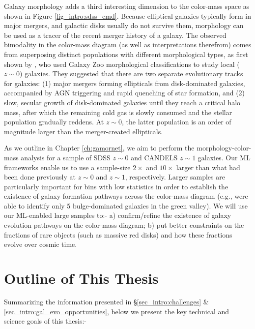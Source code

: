 Galaxy morphology adds a third interesting dimension to the color-mass space as shown in Figure \ref{fig_intro:sdss_cmd}. Because elliptical galaxies typically form in major mergers, and galactic disks usually do not survive them, 
morphology can be used as a tracer of the recent merger history of a galaxy. The observed bimodality in the color-mass diagram (as well as interpretations therefrom) comes from superposing distinct populations with different morphological types, as first shown by \citet{Schawinski2014TheGalaxies}, who used Galaxy Zoo morphological classifications to study local ($z\sim0$) galaxies. They suggested that there are two separate evolutionary tracks for galaxies: (1) major mergers forming ellipticals from disk-dominated galaxies, accompanied by AGN triggering and rapid quenching of star formation, and (2) slow, secular growth of disk-dominated galaxies until they reach a critical halo mass, after which the remaining cold gas is slowly consumed and the stellar population gradually reddens. At $z\sim0$, the latter population is an order of magnitude larger than the merger-created ellipticals. 

As we outline in Chapter \ref{ch:gamornet}, we aim to perform the morphology-color-mass analysis for a sample of SDSS $z\sim0$ and CANDELS $z\sim1$ galaxies. Our ML frameworks enable us to use a sample-size $2\times$ and $10\times$ larger than what had been done previously at $z\sim0$ and $z\sim1$, respectively. Larger samples are particularly important for bins with low statistics in order to establish the existence of galaxy formation pathways across the color-mass diagram (e.g., \cite{powell_17} were able to identify only 5 bulge-dominated galaxies in the green valley). We will use our ML-enabled large samples to:- a) confirm/refine the existence of galaxy evolution pathways on the color-mass diagram; b) put better constraints on the fractions of rare objects (such as massive red disks) and how these fractions evolve over cosmic time. 


\section{Outline of This Thesis} \label{sec_intro:thesis_outline}

Summarizing the information presented in \S \ref{sec_intro:challenges} \& \ref{sec_intro:gal_evo_opportunities}, below we present the key technical and science goals of this thesis:-

